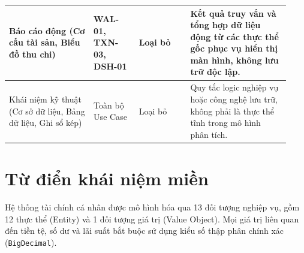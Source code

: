 \documentclass[11pt,a4paper]{article}
\newcommand{\code}[1]{\texttt{#1}}
\newenvironment{smalltable}{\begingroup\footnotesize\renewcommand{\arraystretch}{1.25}\setlength{\tabcolsep}{3pt}}{\endgroup}
\begin{document}
\begin{smalltable}
\begin{longtable}{|L{0.28\linewidth}|L{0.15\linewidth}|L{0.17\linewidth}|L{0.33\linewidth}|}
Báo cáo động (Cơ cấu tài sản, Biểu đồ thu chi) & WAL-01, TXN-03, DSH-01 & Loại bỏ & Kết quả truy vấn và tổng hợp dữ liệu động từ các thực thể gốc phục vụ hiển thị màn hình, không lưu trữ độc lập. \\ \hline
Khái niệm kỹ thuật (Cơ sở dữ liệu, Bảng dữ liệu, Ghi sổ kép) & Toàn bộ Use Case & Loại bỏ & Quy tắc logic nghiệp vụ hoặc công nghệ lưu trữ, không phải là thực thể tĩnh trong mô hình phân tích. \\ \hline
\end{longtable}
\end{smalltable}

\section{Từ điển khái niệm miền}

Hệ thống tài chính cá nhân được mô hình hóa qua 13 đối tượng nghiệp vụ, gồm 12 thực thể (Entity) và 1 đối tượng giá trị (Value Object). Mọi giá trị liên quan đến tiền tệ, số dư và lãi suất bắt buộc sử dụng kiểu số thập phân chính xác (\code{BigDecimal}).
\end{document}
